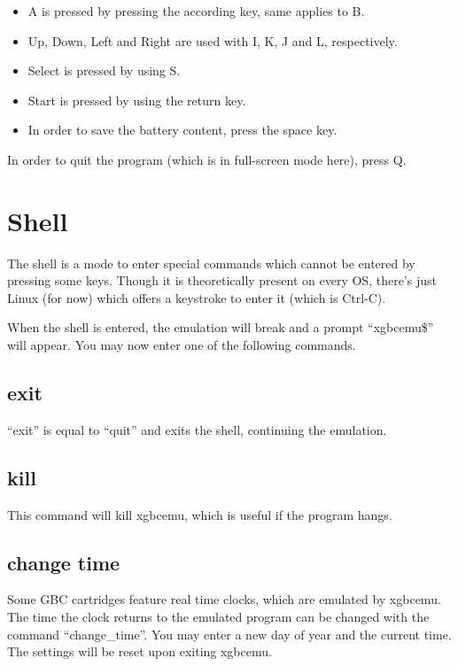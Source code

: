\documentclass[fleqn,english,openany]{scrbook}
\begin{document}
\begin{itemize}
\item A is pressed by pressing the according key, same applies to B.
\item Up, Down, Left and Right are used with I, K, J and L, respectively.
\item Select is pressed by using S.
\item Start is pressed by using the return key.
\item In order to save the battery content, press the space key.
\end{itemize}

In order to quit the program (which is in full-screen mode here), press Q.


\section{Shell}

The shell is a mode to enter special commands which cannot be entered by pressing some keys. Though it is theoretically
present on every OS, there's just Linux (for now) which offers a keystroke to enter it (which is Ctrl-C).

When the shell is entered, the emulation will break and a prompt “xgbcemu\$” will appear. You may now enter one of the
following commands.

\subsection{exit}

“exit” is equal to “quit” and exits the shell, continuing the emulation.

\subsection{kill}

This command will kill xgbcemu, which is useful if the program hangs.

\subsection{change time}

Some GBC cartridges feature real time clocks, which are emulated by xgbcemu. The time the clock returns to the emulated
program can be changed with the command “change\_time”. You may enter a new day of year and the current time. The
settings will be reset upon exiting xgbcemu.
\end{document}

